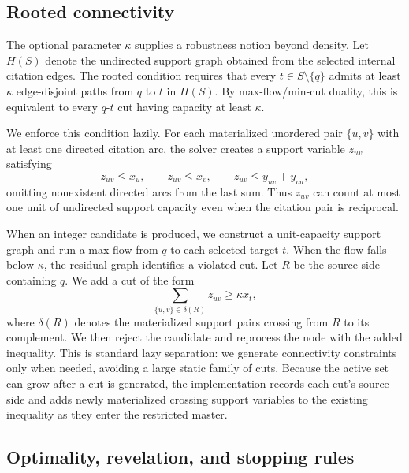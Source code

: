\documentclass[12pt]{article}
\begin{document}
\subsection{Rooted connectivity}
\label{subsec:connectivity}

The optional parameter $\kappa$ supplies a robustness notion beyond density.  Let $H(S)$ denote the undirected support graph obtained from the selected internal citation edges.  The rooted condition requires that every $t\in S\setminus\{q\}$ admits at least $\kappa$ edge-disjoint paths from $q$ to $t$ in $H(S)$.  By max-flow/min-cut duality, this is equivalent to every $q$-$t$ cut having capacity at least $\kappa$.

We enforce this condition lazily.  For each materialized unordered pair $\{u,v\}$ with at least one directed citation arc, the solver creates a support variable $z_{uv}$ satisfying
\[
  z_{uv}\le x_u,\qquad z_{uv}\le x_v,\qquad
  z_{uv}\le y_{uv}+y_{vu},
\]
omitting nonexistent directed arcs from the last sum.  Thus $z_{uv}$ can count at most one unit of undirected support capacity even when the citation pair is reciprocal.

When an integer candidate is produced, we construct a unit-capacity support graph and run a max-flow from $q$ to each selected target $t$.  When the flow falls below $\kappa$, the residual graph identifies a violated cut.  Let $R$ be the source side containing $q$.  We add a cut of the form
\begin{equation}
  \label{eq:kappa-cut}
  \sum_{\{u,v\}\in \delta(R)} z_{uv} \ge \kappa x_t,
\end{equation}
where $\delta(R)$ denotes the materialized support pairs crossing from $R$ to its complement.  We then reject the candidate and reprocess the node with the added inequality.  This is standard lazy separation: we generate connectivity constraints only when needed, avoiding a large static family of cuts.  Because the active set can grow after a cut is generated, the implementation records each cut's source side and adds newly materialized crossing support variables to the existing inequality as they enter the restricted master.

\subsection{Optimality, revelation, and stopping rules}
\label{subsec:guarantees}
\end{document}

